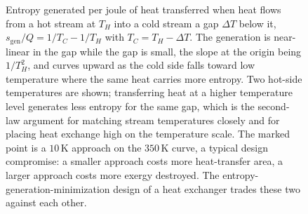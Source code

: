 \begin{figure}[htbp]
\centering
{}
\caption[Entropy generated by heat crossing a temperature gap]{Entropy generated
per joule of heat transferred when heat flows from a hot stream at $T_H$ into a
cold stream a gap $\Delta T$ below it, $s_{\mathrm{gen}}/Q = 1/T_C - 1/T_H$ with
$T_C = T_H - \Delta T$. The generation is near-linear in the gap while the gap is
small, the slope at the origin being $1/T_H^2$, and curves upward as the cold
side falls toward low temperature where the same heat carries more entropy. Two
hot-side temperatures are shown; transferring heat at a higher temperature level
generates less entropy for the same gap, which is the second-law argument for
matching stream temperatures closely and for placing heat exchange high on the
temperature scale. The marked point is a $10\,\si{\kelvin}$ approach on the
$350\,\si{\kelvin}$ curve, a typical design compromise: a smaller approach costs
more heat-transfer area, a larger approach costs more exergy destroyed. The
entropy-generation-minimization design of a heat exchanger trades these two
against each other.}
\label{fig:vol04ch04:heatexchange-entropy}
\end{figure}
